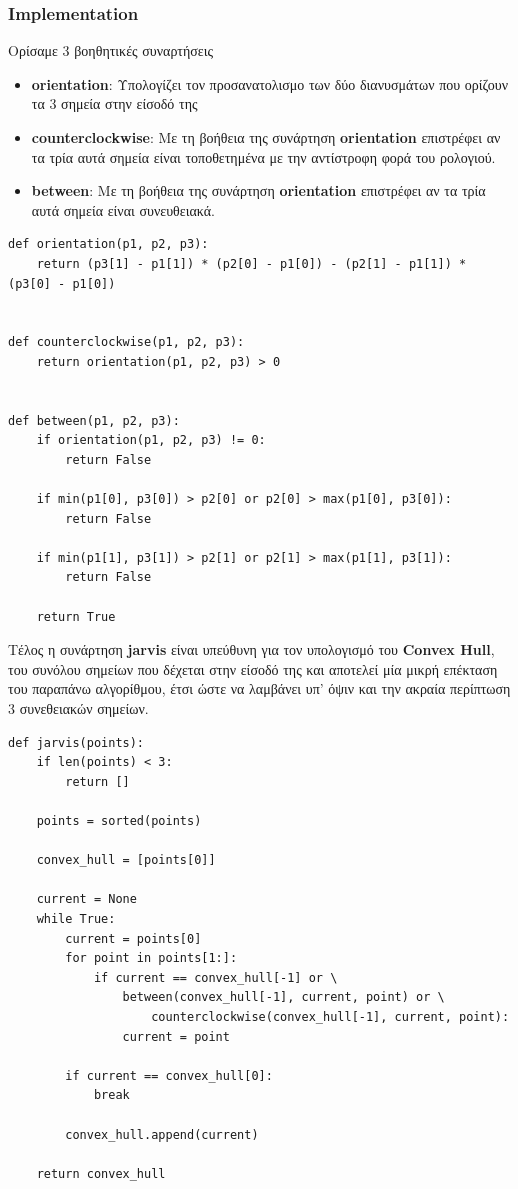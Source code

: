 \documentclass[12pt]{article}
\begin{document}
\pagebreak

\subsubsection*{Implementation}

Ορίσαμε 3 βοηθητικές συναρτήσεις

\begin{itemize}
    \item \textbf{orientation}: Υπολογίζει τον προσανατολισμο
    των δύο διανυσμάτων που ορίζουν τα 3 σημεία στην είσοδό της

    \item \textbf{counterclockwise}: Με τη βοήθεια της συνάρτηση
    \textbf{orientation} επιστρέφει αν τα τρία αυτά σημεία είναι
    τοποθετημένα με την αντίστροφη φορά του ρολογιού.

    \item \textbf{between}: Με τη βοήθεια της συνάρτηση
    \textbf{orientation} επιστρέφει αν τα τρία αυτά σημεία είναι
    συνευθειακά.
\end{itemize}

\begin{lstlisting}
def orientation(p1, p2, p3):
    return (p3[1] - p1[1]) * (p2[0] - p1[0]) - (p2[1] - p1[1]) * (p3[0] - p1[0])


def counterclockwise(p1, p2, p3):
    return orientation(p1, p2, p3) > 0


def between(p1, p2, p3):
    if orientation(p1, p2, p3) != 0:
        return False

    if min(p1[0], p3[0]) > p2[0] or p2[0] > max(p1[0], p3[0]):
        return False

    if min(p1[1], p3[1]) > p2[1] or p2[1] > max(p1[1], p3[1]):
        return False

    return True
\end{lstlisting}

\pagebreak

Τέλος η συνάρτηση \textbf{jarvis} είναι υπεύθυνη για τον υπολογισμό
του \textbf{Convex Hull}, του συνόλου σημείων που δέχεται στην είσοδό
της και αποτελεί μία μικρή επέκταση του παραπάνω αλγορίθμου, έτσι ώστε
να λαμβάνει υπ' όψιν και την ακραία περίπτωση 3 συνεθειακών σημείων. \\

\begin{lstlisting}
def jarvis(points):
    if len(points) < 3:
        return []

    points = sorted(points)

    convex_hull = [points[0]]

    current = None
    while True:
        current = points[0]
        for point in points[1:]:
            if current == convex_hull[-1] or \
                between(convex_hull[-1], current, point) or \
                    counterclockwise(convex_hull[-1], current, point):
                current = point

        if current == convex_hull[0]:
            break

        convex_hull.append(current)

    return convex_hull
\end{lstlisting}
\end{document}
